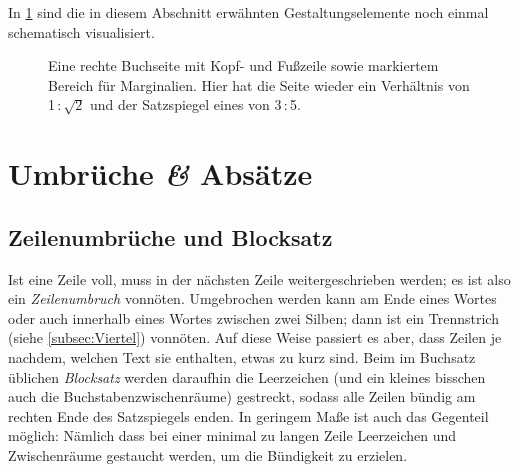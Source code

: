 In \cref{fig:Stege} sind die in diesem Abschnitt erwähnten Gestaltungselemente
noch einmal schematisch visualisiert.

\begin{figure}
  \centering
  \caption{Eine rechte Buchseite mit Kopf- und Fußzeile sowie markiertem Bereich
    für Marginalien. Hier hat die Seite wieder ein Verhältnis von
    1\,:\,$\sqrt{\text{2}}$ und der Satzspiegel eines von 3\,:\,5.}\label{fig:Stege}
\end{figure}

\section{Umbrüche \emph{\&} Absätze}

\subsection{Zeilenumbrüche und Blocksatz}

Ist eine Zeile voll, muss in der nächsten Zeile weitergeschrieben werden; es ist
also ein \emph{Zeilenumbruch} vonnöten. Umgebrochen werden kann am Ende eines
Wortes oder auch innerhalb eines Wortes zwischen zwei Silben; dann ist ein
Trennstrich (siehe \cref{subsec:Viertel}) vonnöten. Auf diese Weise passiert es
aber, dass Zeilen je nachdem, welchen Text sie enthalten, etwas zu kurz
sind. Beim im Buchsatz üblichen \emph{Blocksatz} werden daraufhin die
Leerzeichen (und ein kleines bisschen auch die Buchstabenzwischenräume)
gestreckt, sodass alle Zeilen bündig am rechten Ende des Satzspiegels enden. In
geringem Maße ist auch das Gegenteil möglich: Nämlich dass bei einer minimal zu
langen Zeile Leerzeichen und Zwischenräume gestaucht werden, um die Bündigkeit
zu erzielen.

